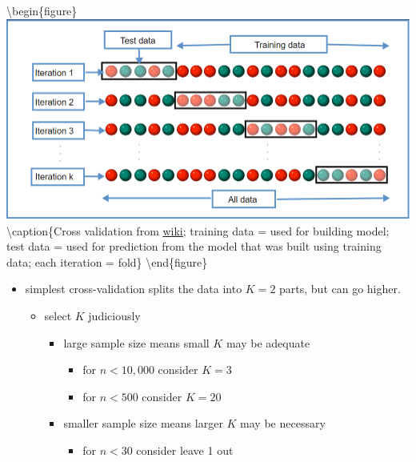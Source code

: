 \documentclass[
]{book}
\providecommand{\tightlist}{%
  \setlength{\itemsep}{0pt}\setlength{\parskip}{0pt}}
\begin{document}
\textbackslash begin\{figure\}
\includegraphics[width=650px]{images/CV} \textbackslash caption\{Cross validation from \href{https://en.wikipedia.org/wiki/Cross-validation_(statistics)}{wiki}; training data = used for building model; test data = used for prediction from the model that was built using training data; each iteration = fold\}\label{fig:cvpic}
\textbackslash end\{figure\}

\begin{itemize}
\tightlist
\item
  simplest cross-validation splits the data into \(K=2\) parts, but can go higher.

  \begin{itemize}
  \tightlist
  \item
    select \(K\) judiciously

    \begin{itemize}
    \tightlist
    \item
      large sample size means small \(K\) may be adequate

      \begin{itemize}
      \tightlist
      \item
        for \(n \lt 10,000\) consider \(K=3\)
      \item
        for \(n \lt 500\) consider \(K=20\)
      \end{itemize}
    \item
      smaller sample size means larger \(K\) may be necessary

      \begin{itemize}
      \tightlist
      \item
        for \(n \lt 30\) consider leave 1 out
      \end{itemize}
    \end{itemize}
  \end{itemize}
\end{itemize}
\end{document}
